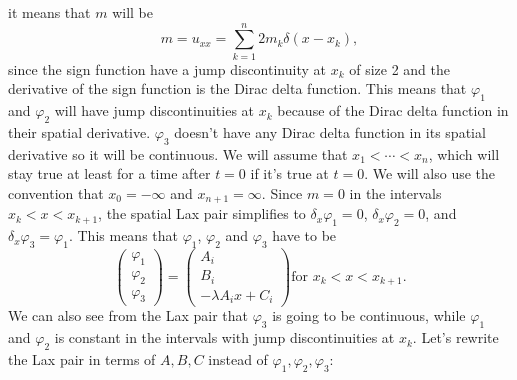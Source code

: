 \documentclass[english,master]{liumaiex}
\theoremstyle{plain}
\theoremstyle{definition}
\begin{document}
it means that $m$ will be
\begin{equation}
	m = u_{xx} = \sum_{k=1}^n 2 m_k \delta(x - x_k),
\end{equation}
since the sign function have a jump discontinuity at $x_k$ of size 2 and the derivative of the sign function is the Dirac delta function. This means that $\varphi_1$ and $\varphi_2$ will have jump discontinuities at $x_k$ because of the Dirac delta function in their spatial derivative. $\varphi_3$ doesn't have any Dirac delta function in its spatial derivative so it will be continuous. We will assume that $x_1 < \cdots < x_n$, which will stay true at least for a time after $t = 0$ if it's true at $t = 0$. We will also use the convention that $x_0 = -\infty$ and $x_{n+1} = \infty$. Since $m = 0$ in the intervals $x_k < x < x_{k+1}$, the spatial Lax pair simplifies to $\delta_x \varphi_1 = 0$, $\delta_x \varphi_2 = 0$, and $\delta_x \varphi_3 = \varphi_1$. This means that $\varphi_1$, $\varphi_2$ and $\varphi_3$ have to be
\begin{equation}
\begin{pmatrix} \varphi_1 \\ \varphi_2 \\ \varphi_3 \end{pmatrix} =
\begin{pmatrix} A_i \\ B_i \\ -\lambda A_i x + C_i \end{pmatrix} 
\text{for } x_k < x < x_{k+1}.
\end{equation}
We can also see from the Lax pair that $\varphi_3$ is going to be continuous, while $\varphi_1$ and $\varphi_2$ is constant in the intervals with jump discontinuities at $x_k$. Let's rewrite the Lax pair in terms of $A, B, C$ instead of $\varphi_1, \varphi_2, \varphi_3$:
\end{document}
